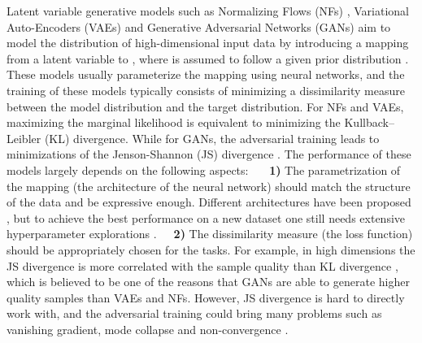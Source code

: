 \documentclass{article}
\begin{document}
\label{sec:introduction}

Latent variable generative models such as Normalizing Flows (NFs) \citep{rezende2015variational,dinh2014nice,dinh2016density,kingma2018glow}, Variational Auto-Encoders (VAEs) \citep{kingma2013auto,rezende2014stochastic} and Generative Adversarial Networks (GANs) \citep{goodfellow2014generative, radford2015unsupervised} aim to model the distribution  of high-dimensional input data  by introducing a mapping from a latent variable  to , where  is assumed to follow a given prior distribution . These models usually parameterize the mapping using neural networks, and the training of these models typically consists of minimizing a dissimilarity measure between the model distribution and the target distribution. For NFs and VAEs, maximizing the marginal likelihood is equivalent to minimizing the Kullback–Leibler (KL) divergence. While for GANs, the adversarial training leads to minimizations of the Jenson-Shannon (JS) divergence \citep{goodfellow2014generative}. The performance of these models largely depends on the following aspects: \newline\ \ \ \textbf{1)} The parametrization of the mapping (the architecture of the neural network) should match the structure of the data and be expressive enough. Different architectures have been proposed \citep{kingma2018glow, van2017neural,karras2017progressive, karras2019style}, but to achieve the best performance on a new dataset one still needs extensive hyperparameter explorations \citep{lucic2018gans}.\newline \ \ \  \textbf{2)} The dissimilarity measure (the loss function) should be appropriately chosen for the tasks. For example, in high dimensions the JS divergence is more correlated with the sample quality than KL divergence \citep{huszar2015not, theis2015note}, which is believed to be one of the reasons that GANs are able to generate higher quality samples than VAEs and NFs. However, JS divergence is hard to directly work with, and the adversarial training could bring many problems such as vanishing gradient, mode collapse and non-convergence \citep{arjovsky2017towards, wiatrak2019stabilizing}.
\end{document}
